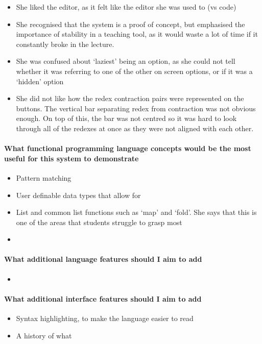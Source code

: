 \begin{itemize}
    \item She liked the editor, as it felt like the editor she was used to (vs code)
    \item She recognised that the system is a proof of concept, but emphasised the importance of stability in a teaching tool, as it would waste a lot of time if it constantly broke in the lecture. 
    \item She was confused about `laziest' being an option, as she could not tell whether it was referring to one of the other on screen options, or if it was a `hidden' option
    \item She did not like how the redex contraction pairs were represented on the buttons. The vertical bar separating redex from contraction was not obvious enough. On top of this, the bar was not centred so it was hard to look through all of the redexes at once as they were not aligned with each other. 
\end{itemize}

\paragraph{What functional programming language concepts would be the most useful for this system to demonstrate}
\begin{itemize}
    \item Pattern matching
    \item User definable data types that allow for 
    \item List and common list functions such as `map' and `fold'. She says that this is one of the areas that students struggle to grasp most
    \item 
\end{itemize}

\paragraph{What additional language features should I aim to add}
\begin{itemize}
    \item 
\end{itemize}

\paragraph{What additional interface features should I aim to add}
\begin{itemize}
    \item Syntax highlighting, to make the language easier to read
    \item A history of what 
\end{itemize}

